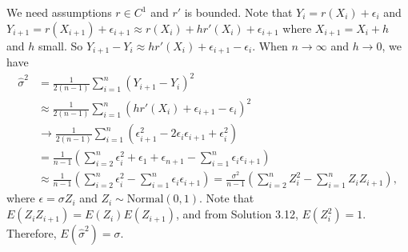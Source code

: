 We need assumptions $r \in C^1$ and $r'$ is bounded.
Note that $Y_i = r(X_i) + \epsilon_i$ and $Y_{i + 1} = r(X_{i + 1}) + \epsilon_{i+1} \approx r(X_i) + hr'(X_i) + \epsilon_{i + 1}$ where $X_{i + 1} = X_i + h$ and $h$ small.
So $Y_{i + 1} - Y_i \approx hr'(X_i) + \epsilon_{i + 1} - \epsilon_i$.
When $n \to \infty$ and $h \to 0$, we have
\begin{equation*}
    \begin{split}
        \hat{\sigma}^2 &= \frac{1}{2(n - 1)} \sum_{i = 1}^n (Y_{i + 1} - Y_i)^2 \\
            &\approx \frac{1}{2(n - 1)} \sum_{i = 1}^n (hr'(X_i) + \epsilon_{i + 1} - \epsilon_i)^2 \\
            &\to \frac{1}{2(n - 1)} \sum_{i = 1}^n (\epsilon_{i + 1}^2 - 2 \epsilon_i \epsilon_{i + 1} + \epsilon_i^2) \\
            &= \frac{1}{n - 1} \left(\sum_{i = 2}^n \epsilon_i^2 + \epsilon_1 + \epsilon_{n + 1} - \sum_{i = 1}^n \epsilon_i \epsilon_{i + 1}\right) \\
            &\approx \frac{1}{n - 1} \left(\sum_{i = 2}^n \epsilon_i^2 - \sum_{i = 1}^n \epsilon_i \epsilon_{i + 1}\right)
            = \frac{\sigma^2}{n - 1} \left(\sum_{i = 2}^n Z_i^2 - \sum_{i = 1}^n Z_i Z_{i + 1}\right),
    \end{split}
\end{equation*}
where $\epsilon = \sigma Z_i$ and $Z_i \sim \mathrm{Normal}(0, 1)$.
Note that $E(Z_i Z_{i + 1}) = E(Z_i) E(Z_{i + 1})$, and from Solution 3.12, $E(Z_i^2) = 1$.
Therefore, $E(\hat{\sigma}^2) = \sigma$.

